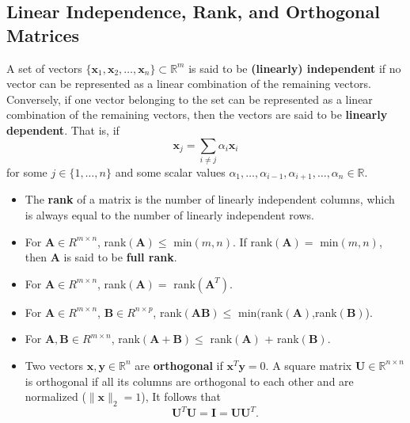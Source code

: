 \subsection{Linear Independence, Rank, and Orthogonal Matrices}
A set of vectors $\{\textbf{x}_{1},\textbf{x}_{2},\ldots,\textbf{x}_{n}\} \subset \mathbb{R}^{m}$ is said to be {\bf (linearly) independent} if no vector can be represented as a linear combination of the remaining vectors. Conversely, if one vector belonging to the set can be represented as a linear combination of the remaining vectors, then the vectors are said to be {\bf linearly dependent}. That is, if 
\begin{equation*}
\textbf{x}_{j}=\sum\limits_{i\neq j}\alpha_{i}\textbf{x}_{i}
\end{equation*}
for some $j \in \{1,\ldots,n\}$ and some scalar values $\alpha_{1}, \ldots, \alpha_{i-1}, \alpha_{i+1}, \ldots, \alpha_{n} \in \mathbb{R}$. 

\begin{itemize}
\item The {\bf rank} of a matrix is the number of linearly independent columns, which is always equal to the number of linearly independent rows.
\item For $\textbf{A} \in R^{m\times n}$, rank$(\textbf{A}) \leq$ min$(m,n)$. If rank$(\textbf{A})=$ min$(m,n)$, then $\textbf{A}$ is said
to be  {\bf full rank}.
\item For $\textbf{A} \in R^{m\times n}$, rank$(\textbf{A})=$ rank$(\textbf{A}^{T})$.
\item For $\textbf{A} \in R^{m\times n}$,  $\textbf{B} \in R^{n\times p}$, rank$(\textbf{AB}) \leq$ min$($rank$(\textbf{A})$,rank$(\textbf{B})$).
\item For $\textbf{A},\textbf{B} \in R^{m\times n}$, rank$(\textbf{A}+\textbf{B}) \leq$ rank$(\textbf{A})$ + rank$(\textbf{B})$.
\item Two vectors $\textbf{x},\textbf{y} \in \mathbb{R}^{n}$ are {\bf orthogonal} if $\textbf{x}^{T}\textbf{y}=0$. A square matrix $\textbf{U} \in \mathbb{R}^{n\times n}$ is orthogonal if all its columns are orthogonal to each other and are normalized ($\|\textbf{x}\|_{2} = 1$), It follows that
\begin{equation*}
\textbf{U}^{T}\textbf{U}=\textbf{I}=\textbf{UU}^{T}.
\end{equation*}
\end{itemize}



